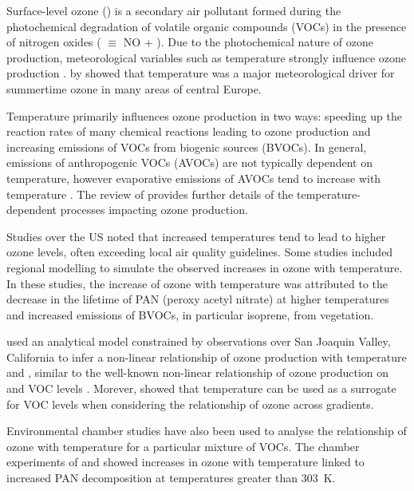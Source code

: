 Surface-level ozone () is a secondary air pollutant formed during the photochemical degradation of volatile organic compounds (VOCs) in the presence of nitrogen oxides ( $\equiv$ NO + ).
Due to the photochemical nature of ozone production, meteorological variables such as temperature strongly influence ozone production \citep{Jacob:2009}.
by \citet{Otero:2016} showed that temperature was a major meteorological driver for summertime ozone in many areas of central Europe.

Temperature primarily influences ozone production in two ways: speeding up the reaction rates of many chemical reactions leading to ozone production and increasing emissions of VOCs from biogenic sources (BVOCs).
In general, emissions of anthropogenic VOCs (AVOCs) are not typically dependent on temperature, however evaporative emissions of AVOCs tend to increase with temperature \citep{Rubin:2006}.
The review of \citet{Pusede:2015} provides further details of the temperature-dependent processes impacting ozone production.

Studies over the US \citep{Sillman:1995a, Dawson:2007, Pusede:2014} noted that increased temperatures tend to lead to higher ozone levels, often exceeding local air quality guidelines.
Some studies \citep{Sillman:1995a, Dawson:2007} included regional modelling to simulate the observed increases in ozone with temperature.
In these studies, the increase of ozone with temperature was attributed to the decrease in the lifetime of PAN (peroxy acetyl nitrate) at higher temperatures and increased emissions of BVOCs, in particular isoprene, from vegetation.

\citet{Pusede:2014} used an analytical model constrained by observations over San Joaquin Valley, California to infer a non-linear relationship of ozone production with temperature and , similar to the well-known non-linear relationship of ozone production on  and VOC levels \citep{Sillman:1999}.
Morever, \citet{Pusede:2014} showed that temperature can be used as a surrogate for VOC levels when considering the relationship of ozone across  gradients.

Environmental chamber studies have also been used to analyse the relationship of ozone with temperature for a particular mixture of VOCs.
The chamber experiments of \citet{Carter:1979} and \citet{Hatakeyama:1991} showed increases in ozone with temperature linked to increased PAN decomposition at temperatures greater than $303$~K.

